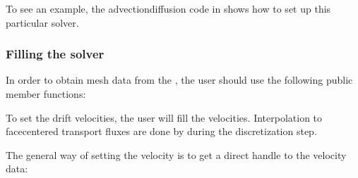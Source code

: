 \documentclass[letterpaper,10pt,english]{sphinxmanual}
\begin{document}
\sphinxAtStartPar
To see an example, the advection\sphinxhyphen{}diffusion code in  shows how to set up this particular solver.


\subsubsection{Filling the solver}
\label{\detokenize{Solvers/CDR:filling-the-solver}}
\sphinxAtStartPar
In order to obtain mesh data from the , the user should use the following public member functions:

\begin{sphinxVerbatim}[commandchars=\\\{\},formatcom=\scriptsize]
                                
                             
               
   
                               
                           
\end{sphinxVerbatim}

\sphinxAtStartPar
To set the drift velocities, the user will fill the  velocities.
Interpolation to face\sphinxhyphen{}centered transport fluxes are done by  during the discretization step.

\sphinxAtStartPar
The general way of setting the velocity is to get a direct handle to the velocity data:

\begin{sphinxVerbatim}[commandchars=\\\{\},formatcom=\scriptsize]
 

   
\end{sphinxVerbatim}
\end{document}
